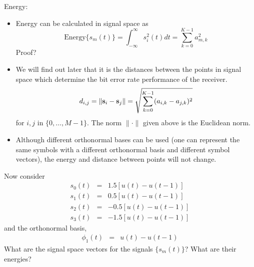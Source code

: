 Energy:
\begin{itemize}
  \item Energy can be calculated in signal space as
    \[
      \mbox{Energy}\{s_m(t)\} = \int_{-\infty}^{\infty}  s_i^2(t) dt = \sum_{k=0}^{K-1}  a_{m,k}^2
    \]
    Proof?
  \item We will find out later that it is the distances between
    the points in signal space which determine the bit error rate
    performance of the receiver.
    \[
      d_{i,j} = \| \mathbf{s}_i - \mathbf{s}_j \| = \sqrt{\sum_{k=0}^{K-1} (a_{i,k} - a_{j,k})^2 }
    \]
    for $i,j$ in $\{0, \ldots, M-1\}$.  The norm $\| \cdot \|$ given above is the Euclidean norm.
  \item Although different orthonormal bases can be used (one can represent the same symbols with a different orthonormal basis and different symbol vectors), the energy and
    distance between points will not change.
\end{itemize}

 Now consider
\begin{eqnarray}
  s_0(t) &=& 1.5[u(t) - u(t-1)] \nonumber \\
  s_1(t) &=& 0.5[u(t) - u(t-1)] \nonumber \\
  s_2(t) &=& -0.5[u(t) - u(t-1)] \nonumber \\
  s_3(t) &=& -1.5[u(t) - u(t-1)] \nonumber
\end{eqnarray}
and the orthonormal basis,
\begin{eqnarray}
  \phi_1(t) &=& u(t) - u(t-1) \nonumber
\end{eqnarray}
What are the signal space vectors for the signals $\{s_m(t)\}$? What
are their energies?




